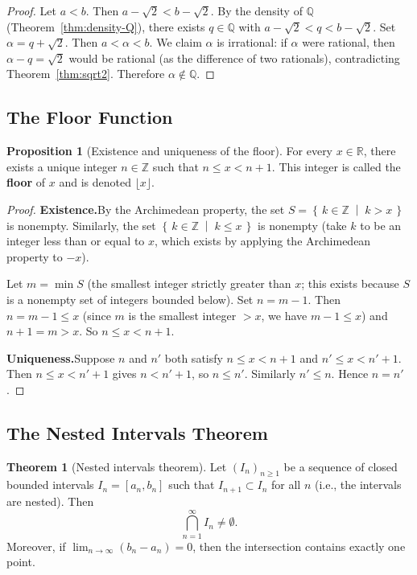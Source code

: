 \documentclass[12pt,a4paper,openany]{book}
\newcommand{\Z}{\mathbb{Z}}
\newcommand{\Q}{\mathbb{Q}}
\newcommand{\R}{\mathbb{R}}
\newcommand{\setcond}[2]{\left\{\,#1\;\middle|\;#2\,\right\}}
\theoremstyle{definition}
\newtheorem{theorem}{Theorem}[chapter]
\newtheorem{proposition}{Proposition}[chapter]
\theoremstyle{remark}
\begin{document}
\begin{proof}
Let $a < b$.  Then $a - \sqrt{2} < b - \sqrt{2}$.  By the density of
$\Q$ (Theorem~\ref{thm:density-Q}), there exists $q \in \Q$ with
$a - \sqrt{2} < q < b - \sqrt{2}$.  Set $\alpha = q + \sqrt{2}$.  Then
$a < \alpha < b$.  We claim $\alpha$ is irrational: if $\alpha$ were
rational, then $\alpha - q = \sqrt{2}$ would be rational (as the difference
of two rationals), contradicting Theorem~\ref{thm:sqrt2}.  Therefore
$\alpha \notin \Q$.
\end{proof}

\subsection{The Floor Function}
\label{subsec:floor}

\begin{proposition}[Existence and uniqueness of the floor]\label{prop:floor}
For every $x \in \R$, there exists a unique integer $n \in \Z$ such that
$n \leq x < n+1$.  This integer is called the \textbf{floor} of $x$ and is
denoted $\lfloor x \rfloor$.
\end{proposition}

\begin{proof}
\textbf{Existence.}\quad By the Archimedean property, the set
$S = \setcond{k \in \Z}{k > x}$ is nonempty.  Similarly, the set
$\setcond{k \in \Z}{k \leq x}$ is nonempty (take $k$ to be an integer
less than or equal to $x$, which exists by applying the Archimedean
property to $-x$).

Let $m = \min S$ (the smallest integer strictly greater than $x$; this
exists because $S$ is a nonempty set of integers bounded below).  Set
$n = m - 1$.  Then $n = m - 1 \leq x$ (since $m$ is the smallest integer
$>x$, we have $m-1 \leq x$) and $n + 1 = m > x$.  So $n \leq x < n + 1$.

\textbf{Uniqueness.}\quad Suppose $n$ and $n'$ both satisfy
$n \leq x < n+1$ and $n' \leq x < n'+1$.  Then $n \leq x < n'+1$ gives
$n < n'+1$, so $n \leq n'$.  Similarly $n' \leq n$.  Hence $n = n'$.
\end{proof}

\subsection{The Nested Intervals Theorem}
\label{subsec:nested-intervals}

\begin{theorem}[Nested intervals theorem]\label{thm:nested}
Let $(I_n)_{n \geq 1}$ be a sequence of closed bounded intervals
$I_n = [a_n, b_n]$ such that $I_{n+1} \subset I_n$ for all $n$ (i.e., the
intervals are nested).  Then
\[
  \bigcap_{n=1}^{\infty} I_n \neq \emptyset.
\]
Moreover, if $\lim_{n\to\infty}(b_n - a_n) = 0$, then the intersection
contains exactly one point.
\end{theorem}
\end{document}
